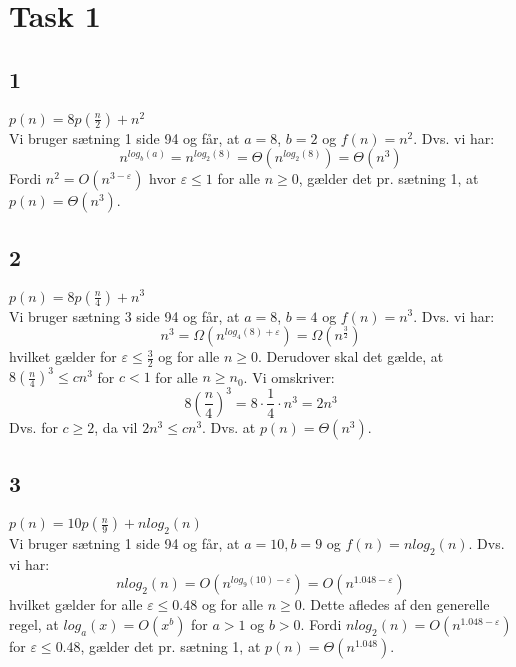 \section{Task 1}

\subsection{1}

$p(n) = 8p(\frac{n}{2}) + n^2$\\
Vi bruger sætning 1 side 94 og får, at $a = 8$, $b = 2$ og $f(n) = n^2$.
Dvs. vi har:
$$n^{log_b(a)} = n^{log_2(8)} = \Theta(n^{log_2(8)}) = \Theta(n^3)$$
Fordi $n^2 = O(n^{3-\varepsilon})$ hvor $\varepsilon \leq 1$ for alle $n \geq 0$, gælder det pr. sætning 1, at $p(n) = \Theta(n^3)$.

\subsection{2}

$p(n) = 8p(\frac{n}{4}) + n^3$\\
Vi bruger sætning 3 side 94 og får, at $a = 8$, $b = 4$ og $f(n) = n^3$.
Dvs. vi har:
$$n^3 = \Omega(n^{log_4(8)+\varepsilon}) = \Omega(n^{\frac{3}{2}})$$
hvilket gælder for $\varepsilon \leq \frac{3}{2}$ og for alle $n \geq 0$.
Derudover skal det gælde, at $8(\frac{n}{4})^3 \leq cn^3$ for $c < 1$ for alle $n \geq n_0$. Vi omskriver:
$$8(\frac{n}{4})^3 = 8 \cdot \frac{1}{4} \cdot n^3 = 2n^3$$
Dvs. for $c \geq 2$, da vil $2n^3 \leq cn^3$.
Dvs. at $p(n) = \Theta(n^3)$.

\subsection{3}

$p(n) = 10p(\frac{n}{9}) + nlog_2(n)$\\
Vi bruger sætning 1 side 94 og får, at $a = 10, b = 9$ og $f(n) = nlog_2(n)$.
Dvs. vi har:
$$nlog_2(n) = O(n^{log_9(10)-\varepsilon}) = O(n^{1.048 - \varepsilon})$$
hvilket gælder for alle $\varepsilon \leq 0.48$ og for alle $n \geq 0$.
Dette afledes af den generelle regel, at $log_a(x) = O(x^b)$ for $a > 1$ og $b > 0$.
Fordi $nlog_2(n) = O(n^{1.048 - \varepsilon})$ for $\varepsilon \leq 0.48$, gælder det pr. sætning 1, at $p(n) = \Theta(n^{1.048})$.

